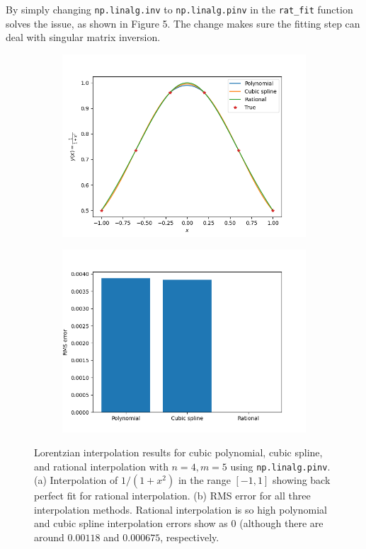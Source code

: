 \documentclass{article}
\begin{document}
By simply changing \verb|np.linalg.inv| to \verb|np.linalg.pinv| in the \verb|rat_fit| function solves the issue, as shown in Figure 5. The change makes sure the fitting step can deal with singular matrix inversion.
\begin{figure}[h!]
\centering
\begin{subfigure}{.5\textwidth}
  \centering
  \includegraphics[width=\linewidth]{images/prob3_lorentzian_func_pinv.png}
  \caption{}
\end{subfigure}%
\begin{subfigure}{.5\textwidth}
  \centering
  \includegraphics[width=\linewidth]{images/prob3_lorentzian_errs_pinv.png}
  \caption{}
\end{subfigure}
\cprotect\caption{Lorentzian interpolation results for cubic polynomial, cubic spline, and rational interpolation with $n=4, m=5$ using \verb|np.linalg.pinv|. (a) Interpolation of $1/(1+x^2)$ in the range $[-1, 1]$ showing back perfect fit for rational interpolation. (b) RMS error for all three interpolation methods. Rational interpolation is so high polynomial and cubic spline interpolation errors show as 0 (although there are around $0.00118$ and $0.000675$, respectively.}
\label{fig:lorentzian_pinv_results}
\end{figure}
\end{document}
